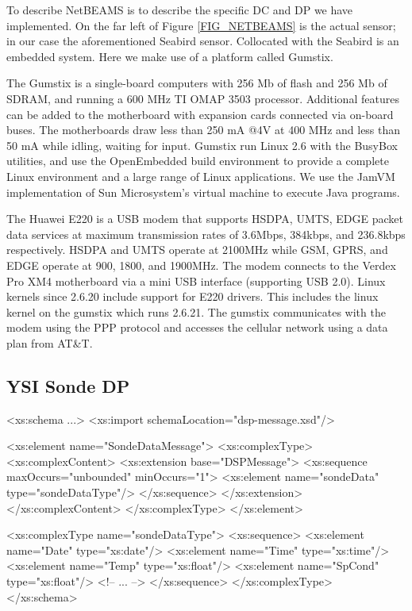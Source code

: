 \documentclass[conference]{IEEEtran}
\begin{document}
\begin{figure*}
\centering
{}
\caption{\label{FIG_NETBEAMS} NetBEAMS architecture.}
\end{figure*}

To describe NetBEAMS is to describe the specific DC and DP we have
implemented. On the far left of Figure \ref{FIG_NETBEAMS} is the
actual sensor; in our case the aforementioned Seabird sensor.
Collocated with the Seabird is an embedded system. Here we make use of
a platform called Gumstix. 

The Gumstix is a single-board computers with 256 Mb of flash and 256
Mb of SDRAM, and running a 600 MHz TI OMAP 3503 processor. Additional
features can be added to the motherboard with expansion cards
connected via on-board buses. The motherboards draw less than 250 mA
@4V at 400 MHz and less than 50 mA while idling, waiting for input.
Gumstix run Linux 2.6 with the BusyBox utilities, and use the
OpenEmbedded build environment to provide a complete Linux
environment and a large range of Linux applications. We use the JamVM
implementation of Sun Microsystem's virtual machine to execute Java
programs. 

The Huawei E220 is a USB modem that supports HSDPA, UMTS, EDGE packet
data services at maximum transmission rates of 3.6Mbps, 384kbps, and
236.8kbps respectively. HSDPA and UMTS operate at 2100MHz while GSM,
GPRS, and EDGE operate at 900, 1800, and 1900MHz. The modem connects
to the Verdex Pro XM4 motherboard via a mini USB interface (supporting
USB 2.0). Linux kernels since 2.6.20 include support for E220 drivers.
This includes the linux kernel on the gumstix which runs 2.6.21.  The
gumstix communicates with the modem using the PPP protocol and
accesses the cellular network using a data plan from AT\&T.



\subsection{YSI Sonde DP}

\begin{code}
<xs:schema ...>
<xs:import schemaLocation="dsp-message.xsd"/>

<xs:element name="SondeDataMessage">
  <xs:complexType>
    <xs:complexContent>
      <xs:extension base="DSPMessage">
        <xs:sequence maxOccurs="unbounded"
                     minOccurs="1">
          <xs:element name="sondeData"
                      type="sondeDataType"/>
        </xs:sequence>
      </xs:extension>
    </xs:complexContent>
  </xs:complexType>
</xs:element>

<xs:complexType name="sondeDataType">
  <xs:sequence>
    <xs:element name="Date" type="xs:date"/>
    <xs:element name="Time" type="xs:time"/>
    <xs:element name="Temp" type="xs:float"/>
    <xs:element name="SpCond" type="xs:float"/>
    <!-- ... -->
  </xs:sequence>
</xs:complexType>
</xs:schema>
\end{code}
\end{document}
